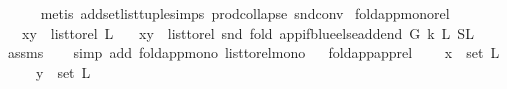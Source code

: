 \begin{isabellebody}
\ \ \ \ \isamarkupfalse%
\ {\isacharparenleft}{\kern0pt}metis\ add{\isacharunderscore}{\kern0pt}set{\isacharunderscore}{\kern0pt}list{\isacharunderscore}{\kern0pt}tuple{\isachardot}{\kern0pt}simps\ prod{\isachardot}{\kern0pt}collapse\ snd{\isacharunderscore}{\kern0pt}conv{\isacharparenright}{\kern0pt}\isanewline
{}\isamarkupfalse%
%
\endisatagproof
{\isafoldproof}%
%
\isadelimproof
\isanewline
%
\endisadelimproof
\isanewline
{}\isamarkupfalse%
\ fold{\isacharunderscore}{\kern0pt}app{\isacharunderscore}{\kern0pt}mono{\isacharunderscore}{\kern0pt}rel{}{\isacharcolon}{\kern0pt}\ \isanewline
\ \ \ {\isachardoublequoteopen}{\isacharparenleft}{\kern0pt}x{\isacharcomma}{\kern0pt}y{\isacharparenright}{\kern0pt}\ {\isasymin}\ list{\isacharunderscore}{\kern0pt}to{\isacharunderscore}{\kern0pt}rel\ L{}{\isachardoublequoteclose}\isanewline
\ \ \ {\isachardoublequoteopen}{\isacharparenleft}{\kern0pt}x{\isacharcomma}{\kern0pt}y{\isacharparenright}{\kern0pt}\ {\isasymin}\ list{\isacharunderscore}{\kern0pt}to{\isacharunderscore}{\kern0pt}rel\ {\isacharparenleft}{\kern0pt}snd\ {\isacharparenleft}{\kern0pt}fold\ {\isacharparenleft}{\kern0pt}app{\isacharunderscore}{\kern0pt}if{\isacharunderscore}{\kern0pt}blue{\isacharunderscore}{\kern0pt}else{\isacharunderscore}{\kern0pt}add{\isacharunderscore}{\kern0pt}end\ G\ k{\isacharparenright}{\kern0pt}\ L{}\ {\isacharparenleft}{\kern0pt}S{\isacharcomma}{\kern0pt}L{}{\isacharparenright}{\kern0pt}{\isacharparenright}{\kern0pt}{\isacharparenright}{\kern0pt}{\isachardoublequoteclose}\ \isanewline
%
\isadelimproof
\ \ %
\endisadelimproof
%
\isatagproof
{}\isamarkupfalse%
\ assms\isanewline
\ \ \isamarkupfalse%
\ {\isacharparenleft}{\kern0pt}simp\ add{\isacharcolon}{\kern0pt}\ fold{\isacharunderscore}{\kern0pt}app{\isacharunderscore}{\kern0pt}mono\ list{\isacharunderscore}{\kern0pt}to{\isacharunderscore}{\kern0pt}rel{\isacharunderscore}{\kern0pt}mono{}{\isacharparenright}{\kern0pt}%
\endisatagproof
{\isafoldproof}%
%
\isadelimproof
\ \isanewline
%
\endisadelimproof
\isanewline
{}\isamarkupfalse%
\ fold{\isacharunderscore}{\kern0pt}app{\isacharunderscore}{\kern0pt}app{\isacharunderscore}{\kern0pt}rel{\isacharcolon}{\kern0pt}\ \isanewline
\ \ \ {\isachardoublequoteopen}x\ {\isasymin}\ set\ L{}{\isachardoublequoteclose}\isanewline
\ \ \ \ \ {\isachardoublequoteopen}y\ {\isasymin}\ set\ L{}{\isachardoublequoteclose}\isanewline

\end{isabellebody}
